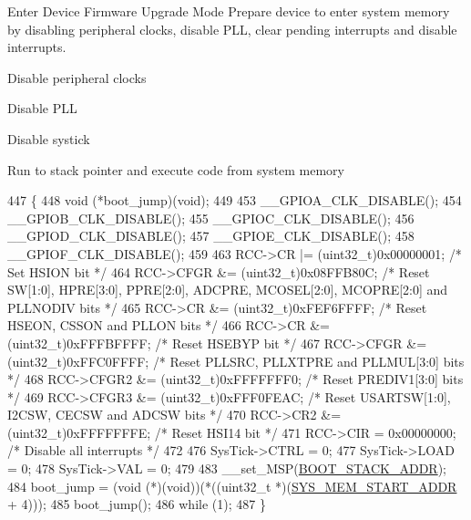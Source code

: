 Enter Device Firmware Upgrade Mode Prepare device to enter system memory by disabling peripheral clocks, disable P\+LL, clear pending interrupts and disable interrupts. 

Disable peripheral clocks

Disable P\+LL

Disable systick

Run to stack pointer and execute code from system memory
\begin{DoxyCode}
447 \{
448     void (*boot\_jump)(void);
449     
453     \_\_GPIOA\_CLK\_DISABLE();
454     \_\_GPIOB\_CLK\_DISABLE();
455     \_\_GPIOC\_CLK\_DISABLE();
456     \_\_GPIOD\_CLK\_DISABLE();
457     \_\_GPIOE\_CLK\_DISABLE();
458     \_\_GPIOF\_CLK\_DISABLE();
459     
463     RCC->CR    |= (uint32\_t)0x00000001; \textcolor{comment}{/* Set HSION bit */}
464     RCC->CFGR  &= (uint32\_t)0x08FFB80C; \textcolor{comment}{/* Reset SW[1:0], HPRE[3:0], PPRE[2:0], ADCPRE, MCOSEL[2:0],
       MCOPRE[2:0] and PLLNODIV bits */}
465     RCC->CR    &= (uint32\_t)0xFEF6FFFF; \textcolor{comment}{/* Reset HSEON, CSSON and PLLON bits */}
466     RCC->CR    &= (uint32\_t)0xFFFBFFFF; \textcolor{comment}{/* Reset HSEBYP bit */}
467     RCC->CFGR  &= (uint32\_t)0xFFC0FFFF; \textcolor{comment}{/* Reset PLLSRC, PLLXTPRE and PLLMUL[3:0] bits */}
468     RCC->CFGR2 &= (uint32\_t)0xFFFFFFF0; \textcolor{comment}{/* Reset PREDIV1[3:0] bits */}
469     RCC->CFGR3 &= (uint32\_t)0xFFF0FEAC; \textcolor{comment}{/* Reset USARTSW[1:0], I2CSW, CECSW and ADCSW bits */}
470     RCC->CR2   &= (uint32\_t)0xFFFFFFFE; \textcolor{comment}{/* Reset HSI14 bit */}
471     RCC->CIR    = 0x00000000;       \textcolor{comment}{/* Disable all interrupts */}
472     
476     SysTick->CTRL = 0;
477     SysTick->LOAD = 0;
478     SysTick->VAL = 0;
479     
483     \_\_set\_MSP(\mbox{\hyperlink{group___s_d___d_f_u___defines_ga21b3d67021ba56888c69720267842d0b}{BOOT\_STACK\_ADDR}});
484     boot\_jump = (void (*)(void))(*((uint32\_t *)(\mbox{\hyperlink{group___s_d___d_f_u___defines_ga15f619642ddd540adedf01b2c32eb950}{SYS\_MEM\_START\_ADDR}} + 4)));
485     boot\_jump();
486     \textcolor{keywordflow}{while} (1);
487 \}
\end{DoxyCode}
